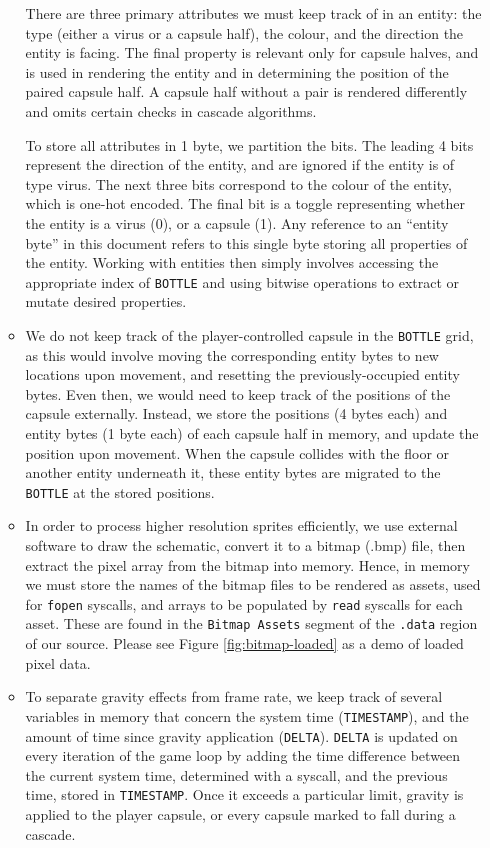 \documentclass{article}
\begin{document}
\begin{enumerate}
\begin{itemize}
There are three primary attributes we must keep track of in an entity: the type (either a virus or a capsule half), the colour, and the direction the entity is facing. The final property is relevant only for capsule halves, and is used in rendering the entity and in determining the position of the paired capsule half. A capsule half without a pair is rendered differently and omits certain checks in cascade algorithms.

To store all attributes in 1 byte, we partition the bits. The leading 4 bits represent the direction of the entity, and are ignored if the entity is of type virus. The next three bits correspond to the colour of the entity, which is one-hot encoded. The final bit is a toggle representing whether the entity is a virus (0), or a capsule (1). Any reference to an ``entity byte'' in this document refers to this single byte storing all properties of the entity. Working with entities then simply involves accessing the appropriate index of \verb|BOTTLE| and using bitwise operations to extract or mutate desired properties.
\item We do not keep track of the player-controlled capsule in the \verb|BOTTLE| grid, as this would involve moving the corresponding entity bytes to new locations upon movement, and resetting the previously-occupied entity bytes. Even then, we would need to keep track of the positions of the capsule externally. Instead, we store the positions (4 bytes each) and entity bytes (1 byte each) of each capsule half in memory, and update the position upon movement. When the capsule collides with the floor or another entity underneath it, these entity bytes are migrated to the \verb|BOTTLE| at the stored positions.
\item In order to process higher resolution sprites efficiently, we use external software to draw the schematic, convert it to a bitmap (.bmp) file, then extract the pixel array from the bitmap into memory. Hence, in memory we must store the names of the bitmap files to be rendered as assets, used for \verb|fopen| syscalls, and arrays to be populated by \verb|read| syscalls for each asset. These are found in the \verb|Bitmap Assets| segment of the \verb|.data| region of our source. Please see Figure \ref{fig:bitmap-loaded} as a demo of loaded pixel data.
\item To separate gravity effects from frame rate, we keep track of several variables in memory that concern the system time (\verb|TIMESTAMP|), and the amount of time since gravity application (\verb|DELTA|). \verb|DELTA| is updated on every iteration of the game loop by adding the time difference between the current system time, determined with a syscall, and the previous time, stored in \verb|TIMESTAMP|. Once it exceeds a particular limit, gravity is applied to the player capsule, or every capsule marked to fall during a cascade.
\end{itemize}
\end{enumerate}
\end{document}

